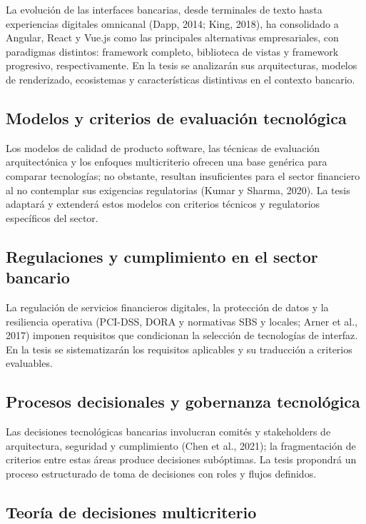 La evolución de las interfaces bancarias, desde terminales de texto hasta
experiencias digitales omnicanal (Dapp, 2014; King, 2018), ha consolidado a
Angular, React y Vue.js como las principales alternativas empresariales, con
paradigmas distintos: framework completo, biblioteca de vistas y framework
progresivo, respectivamente. En la tesis se analizarán sus arquitecturas,
modelos de renderizado, ecosistemas y características distintivas en el
contexto bancario.

\subsection{Modelos y criterios de evaluación tecnológica}

Los modelos de calidad de producto software, las técnicas de evaluación
arquitectónica y los enfoques multicriterio ofrecen una base genérica para
comparar tecnologías; no obstante, resultan insuficientes para el sector
financiero al no contemplar sus exigencias regulatorias (Kumar y Sharma,
2020). La tesis adaptará y extenderá estos modelos con criterios técnicos y
regulatorios específicos del sector.

\subsection{Regulaciones y cumplimiento en el sector bancario}

La regulación de servicios financieros digitales, la protección de datos y la
resiliencia operativa (PCI-DSS, DORA y normativas SBS y locales; Arner et al.,
2017) imponen requisitos que condicionan la selección de tecnologías de
interfaz. En la tesis se sistematizarán los requisitos aplicables y su
traducción a criterios evaluables.

\subsection{Procesos decisionales y gobernanza tecnológica}

Las decisiones tecnológicas bancarias involucran comités y stakeholders de
arquitectura, seguridad y cumplimiento (Chen et al., 2021); la fragmentación
de criterios entre estas áreas produce decisiones subóptimas. La tesis
propondrá un proceso estructurado de toma de decisiones con roles y flujos
definidos.

\subsection{Teoría de decisiones multicriterio}


